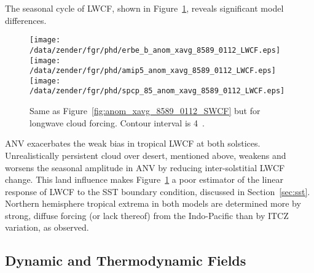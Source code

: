 \documentclass[agums]{aguplus}
\begin{document}
The seasonal cycle of LWCF, shown in
Figure~\ref{fig:anom_xavg_8589_0112_LWCF}, reveals significant model
differences.
\begin{figure}
\begin{center}
\setlength{\widthdim}{\halfwidth}\ifphdcsz{\setlength{\widthdim}{.9\widthdim}}{}
\texttt{[image: /data/zender/fgr/phd/erbe\_b\_anom\_xavg\_8589\_0112\_LWCF.eps]}\vfill
\texttt{[image: /data/zender/fgr/phd/amip5\_anom\_xavg\_8589\_0112\_LWCF.eps]}\vfill
\texttt{[image: /data/zender/fgr/phd/spcp\_85\_anom\_xavg\_8589\_0112\_LWCF.eps]}\vfill
\end{center}
\caption[Same as Figure~\ref{fig:anom_xavg_8589_0112_SWCF} but for 
longwave cloud forcing]{
Same as Figure~\ref{fig:anom_xavg_8589_0112_SWCF} but for longwave
cloud forcing. 
Contour interval is 4~\wxmS.
\label{fig:anom_xavg_8589_0112_LWCF}}   
\end{figure}
ANV exacerbates the weak bias in tropical LWCF at both solstices.
Unrealistically persistent cloud over desert, mentioned above, weakens
and worsens the seasonal amplitude in ANV by reducing inter-solstitial
LWCF change. 
This land influence makes Figure~\ref{fig:anom_xavg_8589_0112_LWCF}
a poor estimator of the linear response of LWCF to the SST boundary
condition, discussed in Section~\ref{sec:sst}.
Northern hemisphere tropical extrema in both models are determined
more by strong, diffuse forcing (or lack thereof) from the
Indo-Pacific than by ITCZ variation, as observed.

\subsection{Dynamic and Thermodynamic Fields}\label{sec:dyn}
\end{document}
